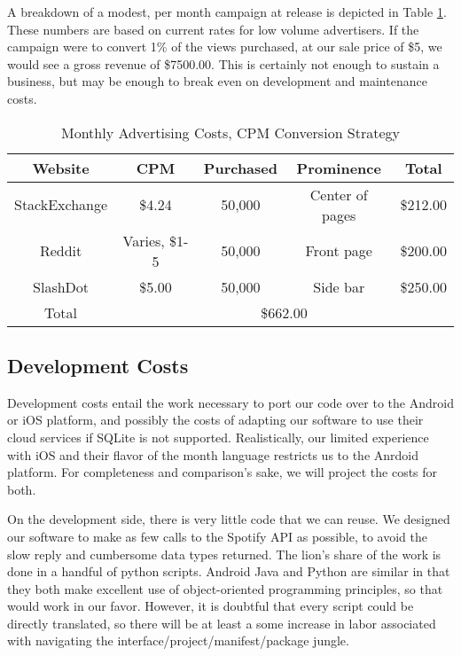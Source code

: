 \documentclass{roffin}
\begin{document}
A breakdown of a modest, per month campaign at release is depicted in Table \ref{adverts}.  These numbers are based on current rates for low volume advertisers.  If the campaign were to convert 1\% of the views purchased, at our sale price of \$5, we would see a gross revenue of \$7500.00.  This is certainly not enough to sustain a business, but may be enough to break even on development and maintenance costs.

\begin{table}[]
\centering
\caption{Monthly Advertising Costs, CPM Conversion Strategy}
\label{adverts}
\begin{tabular}{|c|c|c|c|c|}
\hline
Website       & CPM           & Purchased       & Prominence           & Total \\ \hline
StackExchange & \$4.24        & 50,000          & Center of pages      & \$212.00    \\ \hline
Reddit        & Varies, \$1-5 & 50,000          & Front page           & \$200.00    \\ \hline
SlashDot      & \$5.00        & 50,000          & Side bar             & \$250.00    \\ \hline
Total         &  \multicolumn{4}{c|}{\$662.00} \\ \hline
\end{tabular}
\end{table}

\subsection{Development Costs}
Development costs entail the work necessary to port our code over to the Android or iOS platform, and possibly the costs of adapting our software to use their cloud services if SQLite is not supported.  Realistically, our limited experience with iOS and their flavor of the month language restricts us to the Anrdoid platform.  For completeness and comparison's sake, we will project the costs for both.

On the development side, there is very little code that we can reuse.  We designed our software to make as few calls to the Spotify API as possible, to avoid the slow reply and cumbersome data types returned.  The lion's share of the work is done in a handful of python scripts.  Android Java and Python are similar in that they both make excellent use of object-oriented programming principles, so that would work in our favor.  However, it is doubtful that every script could be directly translated, so there will be at least a some increase in labor associated with navigating the interface/project/manifest/package jungle.
\end{document}
